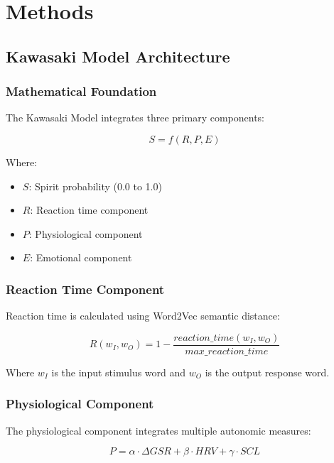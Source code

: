 \documentclass[12pt,a4paper]{article}
\begin{document}
\section{Methods}

\subsection{Kawasaki Model Architecture}

\subsubsection{Mathematical Foundation}

The Kawasaki Model integrates three primary components:

\begin{equation}
S = f(R, P, E)
\end{equation}

Where:
\begin{itemize}
    \item $S$: Spirit probability (0.0 to 1.0)
    \item $R$: Reaction time component
    \item $P$: Physiological component
    \item $E$: Emotional component
\end{itemize}

\subsubsection{Reaction Time Component}

Reaction time is calculated using Word2Vec semantic distance:

\begin{equation}
R(w_I, w_O) = 1 - \frac{reaction\_time(w_I, w_O)}{max\_reaction\_time}
\end{equation}

Where $w_I$ is the input stimulus word and $w_O$ is the output response word.

\subsubsection{Physiological Component}

The physiological component integrates multiple autonomic measures:

\begin{equation}
P = \alpha \cdot \Delta GSR + \beta \cdot HRV + \gamma \cdot SCL
\end{equation}
\end{document}
